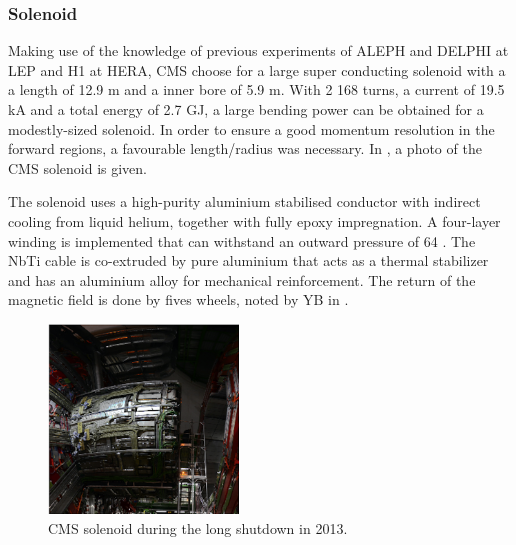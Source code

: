 \subsubsection{Solenoid}
	Making use of the knowledge of previous experiments of ALEPH and DELPHI at LEP and H1 at HERA, CMS choose for a large super conducting solenoid with a a length of 12.9 \si{ \meter} and a inner bore of 5.9 \si{ \meter}\cite{Bayatian:922757}. With 2 168 turns, a current of 19.5 \si{ \kilo \ampere} and  a total energy of 2.7 \si{ \giga \joule}, a large bending power can be obtained for a modestly-sized solenoid. In order to ensure a good momentum resolution in the forward regions, a favourable length/radius was necessary.  In , a photo of the CMS solenoid is given. 

	The solenoid uses a high-purity aluminium stabilised conductor with indirect cooling from liquid helium, together with fully epoxy impregnation. A four-layer winding is implemented that can withstand an outward pressure of 64 \si{ \atm}. The NbTi cable is co-extruded by pure aluminium that acts as a thermal stabilizer and has an aluminium alloy for mechanical reinforcement. The return of the magnetic field is done by fives wheels, noted by YB in .
	
	\begin{figure}[ht]
		\centering
		\includegraphics[width=0.45\textwidth]{2_ExperimentalSetup/Figures/solenoid}
		\caption{CMS solenoid during the long shutdown in 2013. }
		\label{fig:CMSsolenoid}
	\end{figure}	
	
